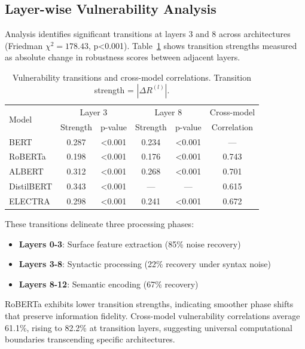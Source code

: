 \documentclass{article}
\begin{document}
\subsection{Layer-wise Vulnerability Analysis}

Analysis identifies significant transitions at layers 3 and 8 across architectures (Friedman $\chi^2=178.43$, p<0.001). Table~\ref{tab:transitions} shows transition strengths measured as absolute change in robustness scores between adjacent layers.

\begin{table}[t]
\centering
\caption{Vulnerability transitions and cross-model correlations. Transition strength = $|\Delta R^{(l)}|$.}
\label{tab:transitions}
\vspace{2mm}
\begin{tabular}{l|cc|cc|c}
\toprule
\multirow{2}{*}{Model} & \multicolumn{2}{c|}{Layer 3} & \multicolumn{2}{c|}{Layer 8} & Cross-model \\
 & Strength & p-value & Strength & p-value & Correlation \\
\midrule
BERT & 0.287 & <0.001 & 0.234 & <0.001 & --- \\
RoBERTa & 0.198 & <0.001 & 0.176 & <0.001 & 0.743 \\
ALBERT & 0.312 & <0.001 & 0.268 & <0.001 & 0.701 \\
DistilBERT & 0.343 & <0.001 & --- & --- & 0.615 \\
ELECTRA & 0.298 & <0.001 & 0.241 & <0.001 & 0.672 \\
\bottomrule
\end{tabular}
\end{table}

These transitions delineate three processing phases:
\begin{itemize}
\item \textbf{Layers 0-3}: Surface feature extraction (85\% noise recovery)
\item \textbf{Layers 3-8}: Syntactic processing (22\% recovery under syntax noise)
\item \textbf{Layers 8-12}: Semantic encoding (67\% recovery)
\end{itemize}

RoBERTa exhibits lower transition strengths, indicating smoother phase shifts that preserve information fidelity. Cross-model vulnerability correlations average 61.1\%, rising to 82.2\% at transition layers, suggesting universal computational boundaries transcending specific architectures.
\end{document}
